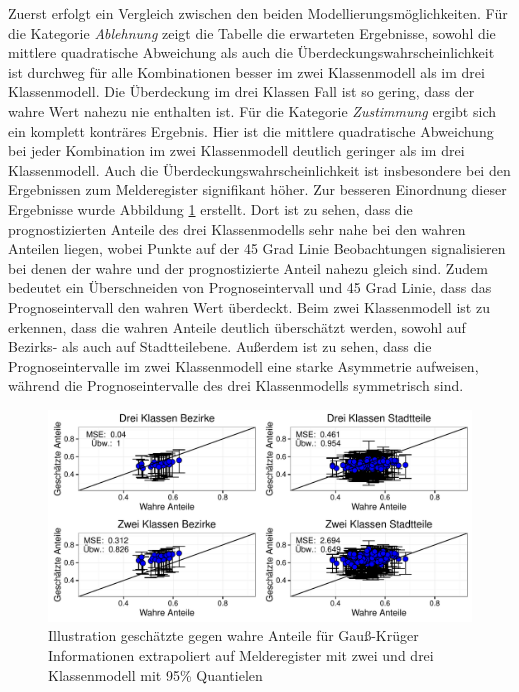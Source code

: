 \documentclass{Vorlage}
\begin{document}
Zuerst erfolgt ein Vergleich zwischen den beiden Modellierungsmöglichkeiten. Für die Kategorie \textit{Ablehnung} zeigt die Tabelle die erwarteten Ergebnisse, sowohl die mittlere quadratische Abweichung als auch die Überdeckungswahrscheinlichkeit ist durchweg für alle Kombinationen besser im zwei Klassenmodell als im drei Klassenmodell. Die Überdeckung im drei Klassen Fall ist so gering, dass der wahre Wert nahezu nie enthalten ist. Für die Kategorie \textit{Zustimmung} ergibt sich ein komplett konträres Ergebnis. Hier ist die mittlere quadratische Abweichung bei jeder Kombination im zwei Klassenmodell deutlich geringer als im drei Klassenmodell. Auch die Überdeckungswahrscheinlichkeit ist insbesondere bei den Ergebnissen zum Melderegister signifikant höher. Zur besseren Einordnung dieser Ergebnisse wurde Abbildung \ref{vali4} erstellt. Dort ist zu sehen, dass die prognostizierten Anteile des drei Klassenmodells sehr nahe bei den wahren Anteilen liegen, wobei Punkte auf der 45 Grad Linie Beobachtungen signalisieren bei denen der wahre und der prognostizierte Anteil nahezu gleich sind. Zudem bedeutet ein Überschneiden von Prognoseintervall und 45 Grad Linie, dass das Prognoseintervall den wahren Wert überdeckt. Beim zwei Klassenmodell ist zu erkennen, dass die wahren Anteile deutlich überschätzt werden, sowohl auf Bezirks- als auch auf Stadtteilebene. Außerdem ist zu sehen, dass die Prognoseintervalle im zwei Klassenmodell eine starke Asymmetrie aufweisen, während die Prognoseintervalle des drei Klassenmodells symmetrisch sind.

\begin{figure}[h]
 \begin{center}
 \includegraphics[scale=0.8]{Pictures/PaT2}
 \caption{Illustration geschätzte gegen wahre Anteile für Gauß-Krüger Informationen extrapoliert auf  Melderegister mit zwei und drei Klassenmodell mit 95\% Quantielen}
 \label{vali4}
 \end{center}
\end{figure}
\end{document}
